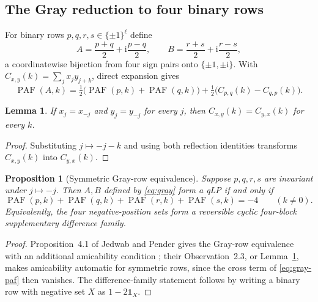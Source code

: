 \documentclass[11pt]{article}
\newtheorem{lemma}[theorem]{Lemma}
\newtheorem{proposition}[theorem]{Proposition}
\newcommand{\PAF}{\operatorname{PAF}}
\newcommand{\ii}{\mathrm{i}}
\newcommand{\roots}{\{\pm 1,\pm\ii\}}
\begin{document}
\subsection*{The Gray reduction to four binary rows}

For binary rows $p,q,r,s\in\{\pm1\}^{\ell}$ define
\begin{equation}
  A=\frac{p+q}{2}+\ii\frac{p-q}{2},
  \qquad
  B=\frac{r+s}{2}+\ii\frac{r-s}{2},
  \label{eq:gray}
\end{equation}
a coordinatewise bijection from four sign pairs onto $\roots$.  With
$C_{x,y}(k)=\sum_j x_jy_{j+k}$, direct expansion gives
\begin{equation}
  \PAF(A,k)
  =\tfrac12\bigl(\PAF(p,k)+\PAF(q,k)\bigr)
  +\tfrac{\ii}{2}\bigl(C_{p,q}(k)-C_{q,p}(k)\bigr).
  \label{eq:gray-paf}
\end{equation}

\begin{lemma}
\label{lem:sym-cross}
If $x_j=x_{-j}$ and $y_j=y_{-j}$ for every $j$, then $C_{x,y}(k)=C_{y,x}(k)$
for every $k$.
\end{lemma}

\begin{proof}
Substituting $j\mapsto -j-k$ and using both reflection identities transforms
$C_{x,y}(k)$ into $C_{y,x}(k)$.
\end{proof}

\begin{proposition}[Symmetric Gray-row equivalence]
\label{prop:gray-sds}
Suppose $p,q,r,s$ are invariant under $j\mapsto-j$.  Then $A,B$ defined by
\eqref{eq:gray} form a qLP if and only if
\begin{equation}
  \PAF(p,k)+\PAF(q,k)+\PAF(r,k)+\PAF(s,k)=-4
  \qquad (k\neq0).
  \label{eq:binary-four-sum}
\end{equation}
Equivalently, the four negative-position sets form a reversible cyclic
four-block supplementary difference family.
\end{proposition}

\begin{proof}
Proposition~4.1 of Jedwab and Pender gives the Gray-row equivalence with an
additional amicability condition \cite{jedwab-pender-2025}; their
Observation~2.3, or Lemma~\ref{lem:sym-cross}, makes amicability automatic for
symmetric rows, since the cross term of \eqref{eq:gray-paf} then vanishes.  The difference-family statement follows by writing a binary
row with negative set $X$ as $1-2\mathbf 1_X$.
\end{proof}
\end{document}
